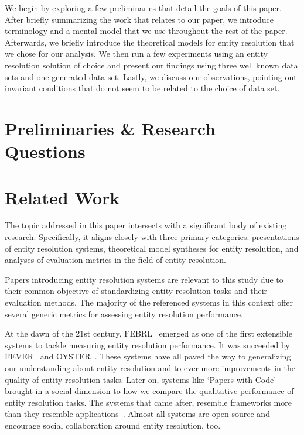 \documentclass[journal]{IEEEtran}
\begin{document}
    We begin by exploring a few preliminaries that detail the goals of this
    paper.
    After briefly summarizing the work that relates to our paper, we introduce
    terminology and a mental model that we use throughout the rest of the paper.
    Afterwards, we briefly introduce the theoretical models for entity
    resolution that we chose for our analysis.
    We then run a few experiments using an entity resolution solution of choice
    and present our findings using three well known data sets and one generated
    data set.
    Lastly, we discuss our observations, pointing out invariant conditions that
    do not seem to be related to the choice of data set.

    \section[preliminaries-questions]{Preliminaries \& Research Questions}
    \label{sec:preliminaries-questions}
    

    \section{Related Work}\label{sec:related}
    
    The topic addressed in this paper intersects with a significant body of
    existing research.
    Specifically, it aligns closely with three primary categories: presentations
    of entity resolution systems, theoretical model syntheses for entity
    resolution, and analyses of evaluation metrics in the field of entity
    resolution.

    Papers introducing entity resolution systems are relevant to this study due
    to their common objective of standardizing entity resolution tasks and their
    evaluation methods.
    The majority of the referenced systems in this context offer several generic
    metrics for assessing entity resolution performance.

    At the dawn of the 21st century, FEBRL~\cite{febrl2002} emerged as one of the
    first extensible systems to tackle measuring entity resolution performance.
    It was succeeded by FEVER~\cite{fever2009} and OYSTER~\cite{oyster2012}.
    These systems have all paved the way to generalizing our understanding about
    entity resolution and to ever more improvements in the quality of entity
    resolution tasks.
    Later on, systems like `Papers with Code'~\cite{papwithcode2019} brought in
    a social dimension to how we compare the qualitative performance of entity
    resolution tasks.
    The systems that came after, resemble frameworks more than they resemble
    applications~\cite{magellan2020,jedai2017}.
    Almost all systems are open-source and encourage social collaboration around
    entity resolution, too.
    
\end{document}
